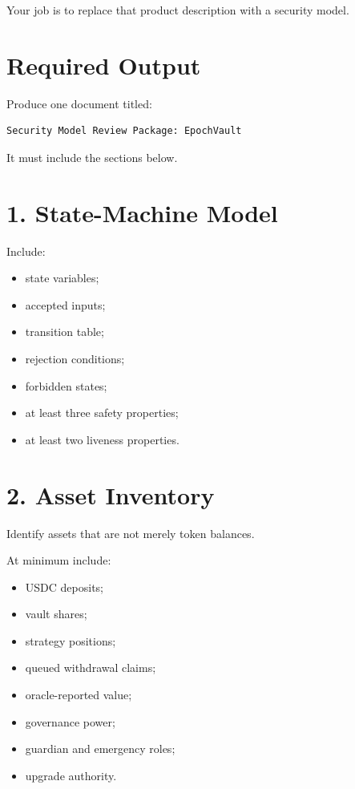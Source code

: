 Your job is to replace that product description with a security model.

\section*{Required Output}

Produce one document titled:

\begin{lstlisting}
Security Model Review Package: EpochVault
\end{lstlisting}

It must include the sections below.

\section*{1. State-Machine Model}

Include:

\begin{itemize}
\tightlist
\item
  state variables;
\item
  accepted inputs;
\item
  transition table;
\item
  rejection conditions;
\item
  forbidden states;
\item
  at least three safety properties;
\item
  at least two liveness properties.
\end{itemize}

\section*{2. Asset Inventory}

Identify assets that are not merely token balances.

At minimum include:

\begin{itemize}
\tightlist
\item
  USDC deposits;
\item
  vault shares;
\item
  strategy positions;
\item
  queued withdrawal claims;
\item
  oracle-reported value;
\item
  governance power;
\item
  guardian and emergency roles;
\item
  upgrade authority.
\end{itemize}

